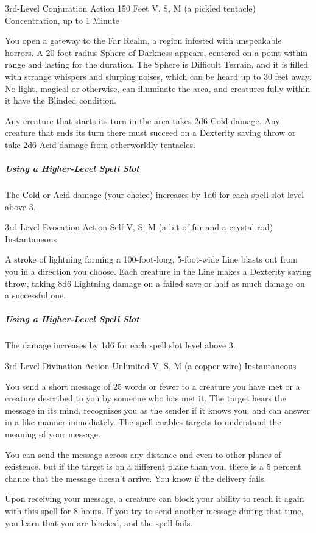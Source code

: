 \documentclass[letterpaper,openany,oneside,twocolumn]{book}
\begin{document}
	{3rd-Level Conjuration}
	{Action}
	{150 Feet}
	{V, S, M (a pickled tentacle)}
	{Concentration, up to 1 Minute}

You open a gateway to the Far Realm, a region infested with unspeakable horrors. A 20-foot-radius Sphere of Darkness appears, centered on a point within range and lasting for the duration. The Sphere is Difficult Terrain, and it is filled with strange whispers and slurping noises, which can be heard up to 30 feet away. No light, magical or otherwise, can illuminate the area, and creatures fully within it have the Blinded condition.

Any creature that starts its turn in the area takes 2d6 Cold damage. Any creature that ends its turn there must succeed on a Dexterity saving throw or take 2d6 Acid damage from otherworldly tentacles.

\subparagraph*{Using a Higher-Level Spell Slot} The Cold or Acid damage (your choice) increases by 1d6 for each spell slot level above 3.

	{3rd-Level Evocation}
	{Action}
	{Self}
	{V, S, M (a bit of fur and a crystal rod)}
	{Instantaneous}

A stroke of lightning forming a 100-foot-long, 5-foot-wide Line blasts out from you in a direction you choose. Each creature in the Line makes a Dexterity saving throw, taking 8d6 Lightning damage on a failed save or half as much damage on a successful one.

\subparagraph*{Using a Higher-Level Spell Slot} The damage increases by 1d6 for each spell slot level above 3.

	{3rd-Level Divination}
	{Action}
	{Unlimited}
	{V, S, M (a copper wire)}
	{Instantaneous}

You send a short message of 25 words or fewer to a creature you have met or a creature described to you by someone who has met it. The target hears the message in its mind, recognizes you as the sender if it knows you, and can answer in a like manner immediately. The spell enables targets to understand the meaning of your message.

You can send the message across any distance and even to other planes of existence, but if the target is on a different plane than you, there is a 5 percent chance that the message doesn't arrive. You know if the delivery fails.

Upon receiving your message, a creature can block your ability to reach it again with this spell for 8 hours. If you try to send another message during that time, you learn that you are blocked, and the spell fails.
\end{document}
